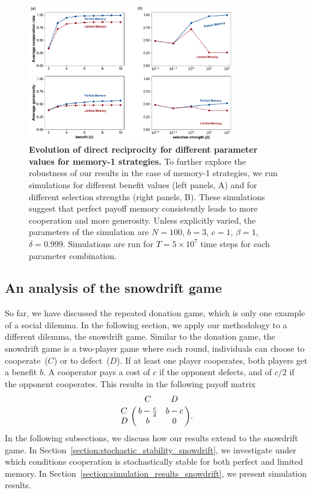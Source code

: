 \documentclass[11pt]{article}
\theoremstyle{plainCl1}
\theoremstyle{plainCl2}
\begin{document}
\begin{figure}[t!]
  \centering 
  \includegraphics[width=0.8\textwidth]{static/cooperation_rate_over_b_and_beta_memory_one.pdf}
  \caption{{\bf Evolution of direct reciprocity for different parameter values for memory-1 strategies.}
  To further explore the robustness of our results in the case of memory-1
  strategies, we run simulations for different benefit values (left panels, A)
  and for different selection strengths (right panels, B). These simulations
  suggest that perfect payoff memory consistently leads to more cooperation and
  more generosity. Unless explicitly varied, the parameters of the simulation
  are $N\!=\!100$, $b\!=\!3$, $c\!=\!1$, $\beta\!=\!1$, $\delta\!=\!0.999$.
  Simulations are run for $T\!=\!5\times 10^7$ time steps for each parameter
  combination.}
  \label{fig:cooperation_rate_over_benefit_and_beta_memory_one}
\end{figure}


\clearpage


\subsection{An analysis of the snowdrift game}
\label{section:furtherrepeatedgames}

So far, we have discussed the repeated donation game, which is only one example
of a social dilemma. In the following section, we apply our methodology to a different dilemma, the snowdrift game.
Similar to the donation game, the snowdrift game is a two-player game where each round, 
individuals can choose to cooperate~(\(C\)) or to defect~(\(D\)).
If at least one player cooperates, both players get a benefit \(b\). 
A cooperator pays a cost of \(c\) if the opponent defects, and of \(c/2\) if the opponent cooperates. This results
in the following payoff matrix
\begin{equation} \label{eq:snowdrift_payoff}
	\bordermatrix{%
		& C & D \cr
		C & b - \frac{c}{2} & b - c  \cr
		D & b & 0 \cr
	} . 
\end{equation}
In the following subsections, we discuss how our results extend to the snowdrift
game. In Section~\ref{section:stochastic_stability_snowdrift}, we investigate
under which conditions cooperation is stochastically stable for both perfect and
limited memory. In Section~\ref{section:simulation_results_snowdrift},
we present simulation results.
\end{document}
